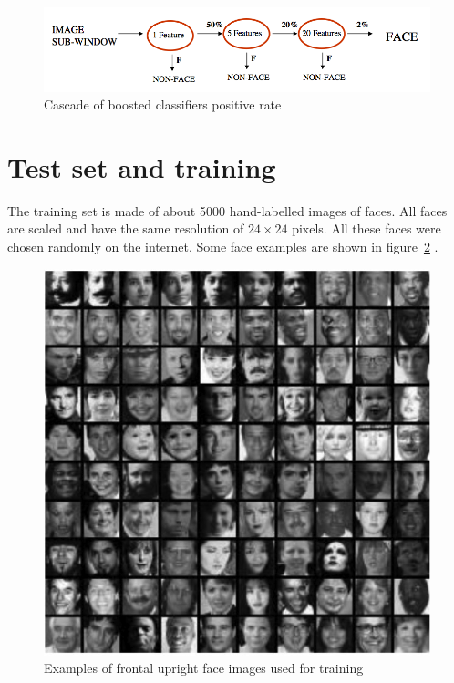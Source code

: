 \begin{figure}[!h]
\begin{center}
\noindent \includegraphics[scale=0.5]{figures/haar_feature_cascade_rate} 
\newline
\caption{Cascade of boosted classifiers positive rate}
\label{haar_feature_cascade_rate}
\end{center} 
\end{figure}

\section{Test set and training}

\vspace{\baselineskip}
\noindent The training set is made of about 5000 hand-labelled images of faces. All faces are scaled and have the same resolution of $ 24\times24 $ pixels. All these faces were chosen randomly on the internet. Some face examples are shown in figure~\ref{haar_feature_training_dataset} \cite{VIO01}.
\newline

\begin{figure}[!h]
\begin{center}
\noindent \includegraphics[scale=0.9]{figures/haar_feature_training_dataset} 
\newline
\caption{Examples of frontal upright face images used for training}
\label{haar_feature_training_dataset}
\end{center} 
\end{figure}

